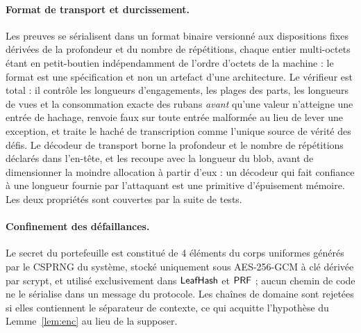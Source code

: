 \documentclass[11pt]{article}
\theoremstyle{definition}
\begin{document}
\paragraph{Format de transport et durcissement.} Les preuves se sérialisent dans un format
binaire versionné aux dispositions fixes dérivées de la profondeur et du nombre de
répétitions, chaque entier multi-octets étant en petit-boutien indépendamment de l'ordre
d'octets de la machine : le format est une spécification et non un artefact d'une
architecture. Le vérifieur est total : il contrôle les longueurs d'engagements, les plages
des parts, les longueurs de vues et la consommation exacte des rubans \emph{avant} qu'une
valeur n'atteigne une entrée de hachage, renvoie faux sur toute entrée malformée au lieu
de lever une exception, et traite le haché de transcription comme l'unique source de
vérité des défis. Le décodeur de transport borne la profondeur et le nombre de répétitions
déclarés dans l'en-tête, et les recoupe avec la longueur du blob, avant de dimensionner la
moindre allocation à partir d'eux : un décodeur qui fait confiance à une longueur fournie
par l'attaquant est une primitive d'épuisement mémoire. Les deux propriétés sont couvertes
par la suite de tests.

\paragraph{Confinement des défaillances.} Le secret du portefeuille est constitué de 4
éléments du corps uniformes générés par le CSPRNG du système, stocké uniquement sous
AES-256-GCM à clé dérivée par scrypt, et utilisé exclusivement dans $\mathsf{LeafHash}$ et $\mathsf{PRF}$
; aucun chemin de code ne le sérialise dans un message du protocole. Les chaînes de
domaine sont rejetées si elles contiennent le séparateur de contexte, ce qui acquitte
l'hypothèse du Lemme~\ref{lem:enc} au lieu de la supposer.
\end{document}
